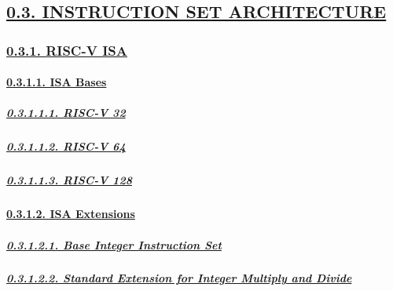 \documentclass[
]{article}
\begin{document}
\hypertarget{instruction-set-architecture}{%
\subsection{\texorpdfstring{\protect\hyperlink{instruction-set-architecture-1}{0.3.
INSTRUCTION SET
ARCHITECTURE}}{0.3. INSTRUCTION SET ARCHITECTURE}}\label{instruction-set-architecture}}

\hypertarget{risc-v-isa}{%
\subsubsection{\texorpdfstring{\protect\hyperlink{risc-v-isa-1}{0.3.1.
RISC-V ISA}}{0.3.1. RISC-V ISA}}\label{risc-v-isa}}

\hypertarget{isa-bases}{%
\paragraph{\texorpdfstring{\protect\hyperlink{isa-bases-3}{0.3.1.1. ISA
Bases}}{0.3.1.1. ISA Bases}}\label{isa-bases}}

\hypertarget{risc-v-32}{%
\subparagraph{\texorpdfstring{\protect\hyperlink{risc-v-32-1}{0.3.1.1.1.
RISC-V 32}}{0.3.1.1.1. RISC-V 32}}\label{risc-v-32}}

\hypertarget{risc-v-64}{%
\subparagraph{\texorpdfstring{\protect\hyperlink{risc-v-64-1}{0.3.1.1.2.
RISC-V 64}}{0.3.1.1.2. RISC-V 64}}\label{risc-v-64}}

\hypertarget{risc-v-128}{%
\subparagraph{\texorpdfstring{\protect\hyperlink{risc-v-128-1}{0.3.1.1.3.
RISC-V 128}}{0.3.1.1.3. RISC-V 128}}\label{risc-v-128}}

\hypertarget{isa-extensions}{%
\paragraph{\texorpdfstring{\protect\hyperlink{isa-extensions-3}{0.3.1.2.
ISA Extensions}}{0.3.1.2. ISA Extensions}}\label{isa-extensions}}

\hypertarget{base-integer-instruction-set}{%
\subparagraph{\texorpdfstring{\protect\hyperlink{base-integer-instruction-set-1}{0.3.1.2.1.
Base Integer Instruction
Set}}{0.3.1.2.1. Base Integer Instruction Set}}\label{base-integer-instruction-set}}

\hypertarget{standard-extension-for-integer-multiply-and-divide}{%
\subparagraph{\texorpdfstring{\protect\hyperlink{standard-extension-for-integer-multiply-and-divide-1}{0.3.1.2.2.
Standard Extension for Integer Multiply and
Divide}}{0.3.1.2.2. Standard Extension for Integer Multiply and Divide}}\label{standard-extension-for-integer-multiply-and-divide}}
\end{document}
